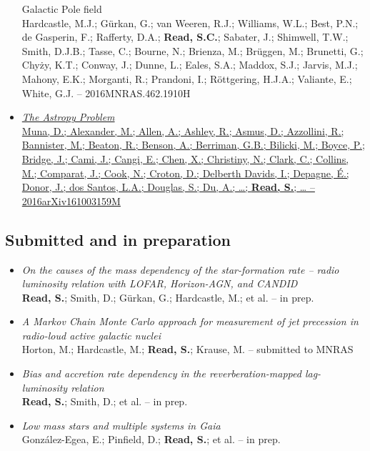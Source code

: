 \documentclass[letterpaper]{twentysecondcv} %
\begin{document}
\begin{finalpages}
\begin{itemize}
{{Galactic Pole field}\\{\small Hardcastle, M.J.; Gürkan, G.; van Weeren, R.J.; Williams, W.L.; Best,
P.N.; de Gasperin, F.; Rafferty, D.A.; \textbf{Read, S.C.}; Sabater, J.;
Shimwell, T.W.; Smith, D.J.B.; Tasse, C.; Bourne, N.; Brienza, M.;
Brüggen, M.; Brunetti, G.; Chyży, K.T.; Conway, J.; Dunne, L.; Eales,
S.A.; Maddox, S.J.; Jarvis, M.J.; Mahony, E.K.; Morganti, R.; Prandoni,
I.; Röttgering, H.J.A.; Valiante, E.; White, G.J. -- 2016MNRAS.462.1910H}}
 \item \href{http://shaun.science/publication/2016-10-00-The-Astropy-Problem}{\textit{The Astropy Problem}\\{\small Muna, D.; Alexander, M.; Allen, A.; Ashley, R.; Asmus, D.; Azzollini,
R.; Bannister, M.; Beaton, R.; Benson, A.; Berriman, G.B.; Bilicki, M.;
Boyce, P.; Bridge, J.; Cami, J.; Cangi, E.; Chen, X.; Christiny, N.;
Clark, C.; Collins, M.; Comparat, J.; Cook, N.; Croton, D.; Delberth
Davids, I.; Depagne, É.; Donor, J.; dos Santos, L.A.; Douglas, S.; Du,
A.; \ldots; \textbf{Read, S.}; \ldots{} -- 2016arXiv161003159M}}
\end{itemize}

\subsection{Submitted and in preparation}
\begin{itemize}
     \item \textit{On the causes of the mass dependency of the star-formation rate -- radio
luminosity relation with LOFAR, Horizon-AGN, and CANDID}\\{\small \textbf{Read, S.}; Smith, D.; Gürkan, G.; Hardcastle, M.; et al. -- in prep.}
 \item \textit{A Markov Chain Monte Carlo approach for measurement of jet precession in
radio-loud active galactic nuclei}\\{\small Horton, M.; Hardcastle, M.; \textbf{Read, S.}; Krause, M. -- submitted to MNRAS}
 \item \textit{Bias and accretion rate dependency in the reverberation-mapped
lag-luminosity relation}\\{\small \textbf{Read, S.}; Smith, D.; et al. -- in prep.}
 \item \textit{Low mass stars and multiple systems in Gaia}\\{\small González-Egea, E.; Pinfield, D.; \textbf{Read, S.}; et al. -- in prep.}
\end{itemize}
\end{finalpages}
\end{document}
